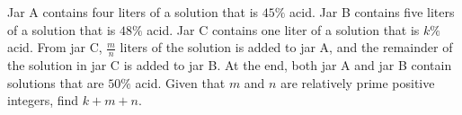 Jar A contains four liters of a solution that is $45\%$ acid. Jar B contains five liters of a solution that is $48\%$ acid. Jar C contains one liter of a solution that is $k\%$ acid. From jar C, $\tfrac{m}{n}$ liters of the solution is added to jar A, and the remainder of the solution in jar C is added to jar B. At the end, both jar A and jar B contain solutions that are $50\%$ acid. Given that $m$ and $n$ are relatively prime positive integers, find $k+m+n$.